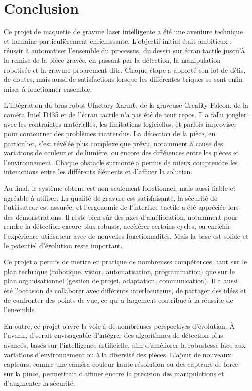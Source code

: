 \chapter{Conclusion}

Ce projet de maquette de gravure laser intelligente a été une aventure technique et humaine particulièrement enrichissante. L'objectif initial était ambitieux : réussir à automatiser l'ensemble du processus, du dessin sur écran tactile jusqu'à la remise de la pièce gravée, en passant par la détection, la manipulation robotisée et la gravure proprement dite. Chaque étape a apporté son lot de défis, de doutes, mais aussi de satisfactions lorsque les différentes briques se sont enfin mises à fonctionner ensemble.

L'intégration du bras robot Ufactory Xarm6, de la graveuse Creality Falcon, de la caméra Intel D435 et de l'écran tactile n'a pas été de tout repos. Il a fallu jongler avec les contraintes matérielles, les limitations logicielles, et parfois improviser pour contourner des problèmes inattendus. La détection de la pièce, en particulier, s'est révélée plus complexe que prévu, notamment à cause des variations de couleur et de lumière, ou encore des différences entre les pièces et l'environnement. Chaque obstacle surmonté a permis de mieux comprendre les interactions entre les différents éléments et d'affiner la solution.

Au final, le système obtenu est non seulement fonctionnel, mais aussi fiable et agréable à utiliser. La qualité de gravure est satisfaisante, la sécurité de l'utilisateur est assurée, et l'ergonomie de l'interface tactile a été appréciée lors des démonstrations. Il reste bien sûr des axes d'amélioration, notamment pour rendre la détection encore plus robuste, accélérer certains cycles, ou enrichir l'expérience utilisateur avec de nouvelles fonctionnalités. Mais la base est solide et le potentiel d’évolution reste important.

Ce projet a permis de mettre en pratique de nombreuses compétences, tant sur le plan technique (robotique, vision, automatisation, programmation) que sur le plan organisationnel (gestion de projet, adaptation, communication). Il a aussi été l'occasion de collaborer avec différents interlocuteurs, de partager des idées et de confronter des points de vue, ce qui a largement contribué à la réussite de l'ensemble.

En outre, ce projet ouvre la voie à de nombreuses perspectives d’évolution. À l’avenir, il serait envisageable d’intégrer des algorithmes de détection plus avancés, basés sur l’intelligence artificielle, afin d’améliorer la robustesse face aux variations d’environnement ou à la diversité des pièces. L’ajout de nouveaux capteurs, comme une caméra couleur haute résolution ou des capteurs de force sur la pince, permettrait d’affiner encore la précision des manipulations et d’augmenter la sécurité.

